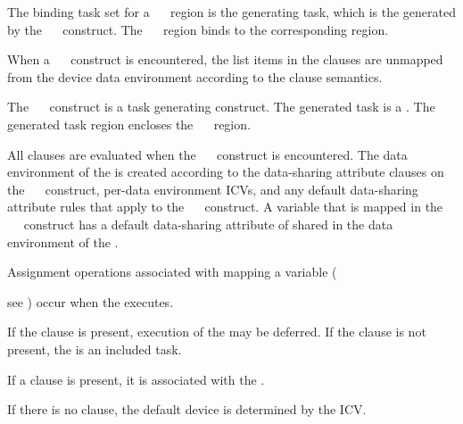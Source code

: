 {\begin{samepage}

\binding
The binding task set for a ~~ region is
the generating task, which is the  generated by the
~~ construct. The
~~ region binds to the corresponding
 region.

\descr
When a ~~ construct is encountered, the list items in the  clauses are unmapped from the device data environment according to the  clause semantics.

The ~~ construct is a task generating construct.  The generated task is a .  The generated task region encloses the ~~ region.

All clauses are evaluated when the ~~ construct is encountered.  The data environment of the  is created according to the data-sharing attribute clauses on the ~~ construct, per-data environment ICVs, and any default data-sharing attribute rules that apply to the ~~ construct.  A variable that is mapped in the ~~ construct has a default data-sharing attribute of shared in the data environment of the .

\end{samepage}

Assignment operations associated with mapping a variable ({see ) occur when the  executes.

If the  clause is present, execution of the  may be deferred.  If the  clause is not present, the  is an included task.

If a  clause is present, it is associated with the .

If there is no  clause, the default device is determined by the  ICV.

}}
